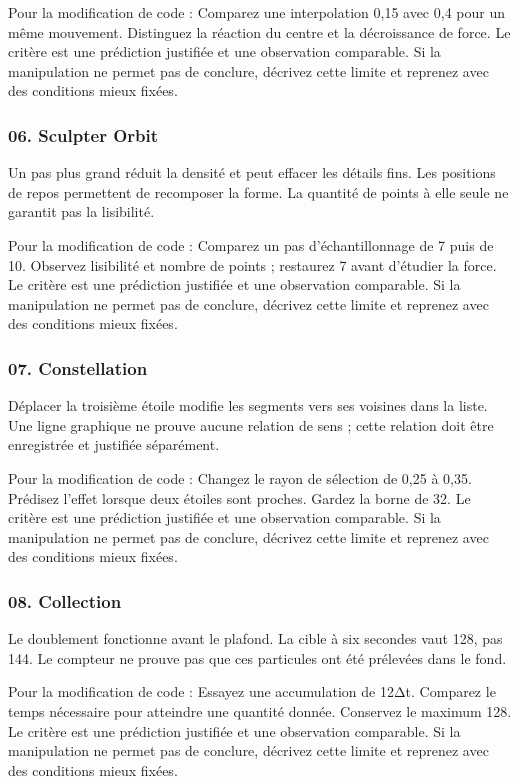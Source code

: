 \documentclass[
  canadien,
  11pt,
  letterpaper,
]{article}
\begin{document}
Pour la modification de code : Comparez une interpolation 0,15 avec 0,4
pour un même mouvement. Distinguez la réaction du centre et la
décroissance de force. Le critère est une prédiction justifiée et une
observation comparable. Si la manipulation ne permet pas de conclure,
décrivez cette limite et reprenez avec des conditions mieux fixées.

\subsubsection{06. Sculpter Orbit}\label{sculpter-orbit}

Un pas plus grand réduit la densité et peut effacer les détails fins.
Les positions de repos permettent de recomposer la forme. La quantité de
points à elle seule ne garantit pas la lisibilité.

Pour la modification de code : Comparez un pas d'échantillonnage de 7
puis de 10. Observez lisibilité et nombre de points ; restaurez 7 avant
d'étudier la force. Le critère est une prédiction justifiée et une
observation comparable. Si la manipulation ne permet pas de conclure,
décrivez cette limite et reprenez avec des conditions mieux fixées.

\subsubsection{07. Constellation}\label{constellation}

Déplacer la troisième étoile modifie les segments vers ses voisines dans
la liste. Une ligne graphique ne prouve aucune relation de sens ; cette
relation doit être enregistrée et justifiée séparément.

Pour la modification de code : Changez le rayon de sélection de 0,25 à
0,35. Prédisez l'effet lorsque deux étoiles sont proches. Gardez la
borne de 32. Le critère est une prédiction justifiée et une observation
comparable. Si la manipulation ne permet pas de conclure, décrivez cette
limite et reprenez avec des conditions mieux fixées.

\subsubsection{08. Collection}\label{collection}

Le doublement fonctionne avant le plafond. La cible à six secondes vaut
128, pas 144. Le compteur ne prouve pas que ces particules ont été
prélevées dans le fond.

Pour la modification de code : Essayez une accumulation de 12Δt.
Comparez le temps nécessaire pour atteindre une quantité donnée.
Conservez le maximum 128. Le critère est une prédiction justifiée et une
observation comparable. Si la manipulation ne permet pas de conclure,
décrivez cette limite et reprenez avec des conditions mieux fixées.
\end{document}
